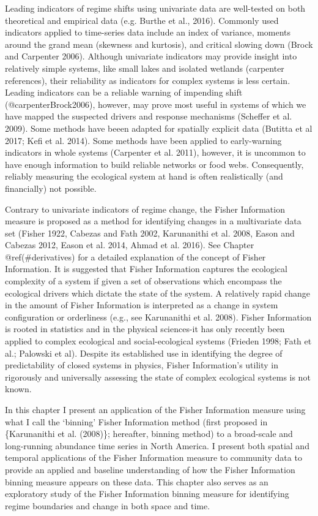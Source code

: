 \documentclass[12pt,twoside,openany]{reedthesis}
\begin{document}
Leading indicators of regime shifts using univariate data are
well-tested on both theoretical and empirical data (e.g. Burthe et al.,
2016). Commonly used indicators applied to time-series data include an
index of variance, moments around the grand mean (skewness and
kurtosis), and critical slowing down (Brock and Carpenter 2006).
Although univariate indicators may provide insight into relatively
simple systems, like small lakes and isolated wetlands (carpenter
references), their reliability as indicators for complex systems is less
certain. Leading indicators can be a reliable warning of impending shift
(@carpenterBrock2006), however, may prove most useful in systems of
which we have mapped the suspected drivers and response mechanisms
(Scheffer et al. 2009). Some methods have beeen adapted for spatially
explicit data (Butitta et al 2017; Kefi et al. 2014). Some methods have
been applied to early-warning indicators in whole systems (Carpenter et
al. 2011), however, it is uncommon to have enough information to build
reliable networks or food webs. Consequently, reliably measuring the
ecological system at hand is often realistically (and financially) not
possible.

Contrary to univariate indicators of regime change, the Fisher
Information measure is proposed as a method for identifying changes in a
multivariate data set (Fisher 1922, Cabezas and Fath 2002, Karunanithi
et al. 2008, Eason and Cabezas 2012, Eason et al. 2014, Ahmad et al.
2016). See Chapter @ref(\#derivatives) for a detailed explanation of the
concept of Fisher Information. It is suggested that Fisher Information
captures the ecological complexity of a system if given a set of
observations which encompass the ecological drivers which dictate the
state of the system. A relatively rapid change in the amount of Fisher
Information is interpreted as a change in system configuration or
orderliness (e.g., see Karunanithi et al. 2008). Fisher Information is
rooted in statistics and in the physical sciences-it has only recently
been applied to complex ecological and social-ecological systems
(Frieden 1998; Fath et al.; Palowski et al). Despite its established use
in identifying the degree of predictability of closed systems in
physics, Fisher Information's utility in rigorously and universally
assessing the state of complex ecological systems is not known.

In this chapter I present an application of the Fisher Information
measure using what I call the `binning' Fisher Information method (first
proposed in \{Karunanithi et al. (2008)\}; hereafter, binning method) to
a broad-scale and long-running abundance time series in North America. I
present both spatial and temporal applications of the Fisher Information
measure to community data to provide an applied and baseline
understanding of how the Fisher Information binning measure appears on
these data. This chapter also serves as an exploratory study of the
Fisher Information binning measure for identifying regime boundaries and
change in both space and time.
\end{document}
